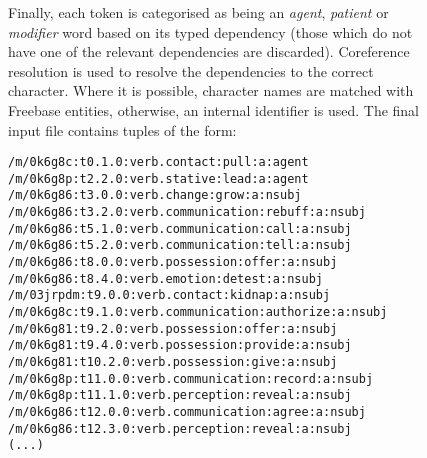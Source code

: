 \begin{figure}[h!]
\centering
\begin{minipage}{14.5cm}
Finally, each token is categorised as being an \textit{agent}, \textit{patient} or \textit{modifier} word based on its typed dependency (those which do not have one of the relevant dependencies are discarded). Coreference resolution is used to resolve the dependencies to the correct character. Where it is possible, character names are matched with Freebase entities, otherwise, an internal identifier is used. The final input file contains tuples of the form:
\vspace{1.5mm}
\begin{Verbatim}[frame=single]
/m/0k6g8c:t0.1.0:verb.contact:pull:a:agent
/m/0k6g8p:t2.2.0:verb.stative:lead:a:agent
/m/0k6g86:t3.0.0:verb.change:grow:a:nsubj
/m/0k6g86:t3.2.0:verb.communication:rebuff:a:nsubj
/m/0k6g86:t5.1.0:verb.communication:call:a:nsubj
/m/0k6g86:t5.2.0:verb.communication:tell:a:nsubj
/m/0k6g86:t8.0.0:verb.possession:offer:a:nsubj
/m/0k6g86:t8.4.0:verb.emotion:detest:a:nsubj
/m/03jrpdm:t9.0.0:verb.contact:kidnap:a:nsubj
/m/0k6g8c:t9.1.0:verb.communication:authorize:a:nsubj
/m/0k6g81:t9.2.0:verb.possession:offer:a:nsubj
/m/0k6g81:t9.4.0:verb.possession:provide:a:nsubj
/m/0k6g81:t10.2.0:verb.possession:give:a:nsubj
/m/0k6g8p:t11.0.0:verb.communication:record:a:nsubj
/m/0k6g8p:t11.1.0:verb.perception:reveal:a:nsubj
/m/0k6g86:t12.0.0:verb.communication:agree:a:nsubj
/m/0k6g86:t12.3.0:verb.perception:reveal:a:nsubj 
(...)
\end{Verbatim}
\end{minipage}
\end{figure}
